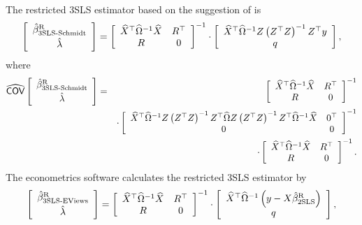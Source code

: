The restricted 3SLS estimator based on the suggestion of
\cite{schmidt90} is
\begin{equation}
   \left[ \begin{array}{c}
      \hat{\beta}^\text{R}_\text{3SLS-Schmidt} \\[0.2em] \hat{\lambda}
   \end{array} \right]
   =
   \left[ \begin{array}{cc}
      \widehat{X}^\top \widehat{\Omega}^{-1} \widehat{X} & R^\top \\
      R & 0
   \end{array} \right]^{-1}
   \cdot
   \left[ \begin{array}{c}
      \widehat{X}^\top \widehat{\Omega}^{-1} Z \left( Z^\top Z \right)^{-1} Z^\top y \\ q
   \end{array} \right] ,
   \label{eq:3slsSchmidtR}
\end{equation}
where
\begin{eqnarray}
   \widehat{\mathsf{COV}}
   \left[ \begin{array}{c}
      \hat{\beta}^\text{R}_\text{3SLS-Schmidt} \\[0.2em] \hat{\lambda}
   \end{array} \right] 
   & = & 
   \left[ \begin{array}{cc}
      \widehat{X}^\top \widehat{\Omega}^{-1} \widehat{X} & R^\top \\
      R & 0
   \end{array} \right]^{-1}
   \\
   & & \cdot
   \left[ \begin{array}{cc}
      \widehat{X}^\top \widehat{\Omega}^{-1} Z \left( Z^\top Z \right)^{-1} Z^\top \widehat{\Omega}
      Z \left( Z^\top Z \right)^{-1} Z^\top \widehat{\Omega}^{-1} \widehat{X} & 0^\top \\
      0 & 0
   \end{array} \right]^{-1}
   \nonumber \\
   & & \cdot
   \left[ \begin{array}{cc}
      \widehat{X}^\top \widehat{\Omega}^{-1} \widehat{X} & R^\top \\
      R & 0
   \end{array} \right]^{-1} .
   \nonumber
\end{eqnarray}
The econometrics software  calculates the restricted 3SLS estimator by
\begin{equation}
   \left[ \begin{array}{c}
      \hat{\beta}^\text{R}_\text{3SLS-EViews} \\[0.2em] \hat{\lambda}
   \end{array} \right]
   =
   \left[ \begin{array}{cc}
      \widehat{X}^\top \widehat{\Omega}^{-1} \widehat{X} & R^\top \\
      R & 0
   \end{array} \right]^{-1}
   \cdot
   \left[ \begin{array}{c}
      \widehat{X}^\top \widehat{\Omega}^{-1} \left( y - X \hat{\beta}^\text{R}_\text{2SLS} \right)
      \\ q 
   \end{array} \right] ,
   \label{eq:3slsEViewsR}
\end{equation}
